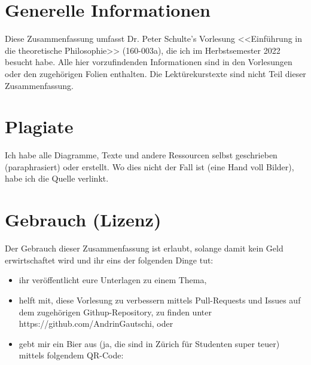 \documentclass[../main.tex]{subfiles}
\begin{document}
\section{Generelle Informationen}
Diese Zusammenfassung umfasst Dr. Peter Schulte's Vorlesung <<Einführung in die theoretische Philosophie>> (160-003a), die ich im Herbstsemester 2022 besucht habe. Alle hier vorzufindenden Informationen sind in den Vorlesungen oder den zugehörigen Folien enthalten. Die Lektürekurstexte sind nicht Teil dieser Zusammenfassung. 

\section{Plagiate}
Ich habe alle Diagramme, Texte und andere Ressourcen selbst geschrieben (paraphrasiert) oder erstellt. Wo dies nicht der Fall ist (eine Hand voll Bilder), habe ich die Quelle verlinkt. 

\section{Gebrauch (Lizenz)}

 Der Gebrauch dieser Zusammenfassung ist erlaubt, solange damit kein Geld erwirtschaftet wird und ihr eins der folgenden Dinge tut:
\begin{itemize}
	\item ihr veröffentlicht eure Unterlagen zu einem Thema,
	\item helft mit, diese Vorlesung zu verbessern mittels Pull-Requests und Issues auf dem zugehörigen Githup-Repository, zu finden unter https://github.com/AndrinGautschi, oder
	\item gebt mir ein Bier aus (ja, die sind in Zürich für Studenten super teuer) mittels folgendem QR-Code:

	\begin{minipage}[t]{\linewidth}
          \raggedright
    \end{minipage}
\end{itemize}
\end{document}
